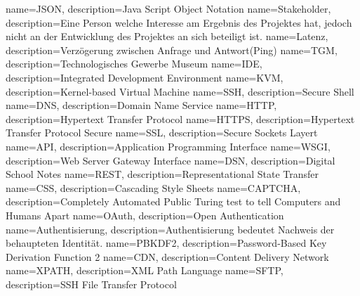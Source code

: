 \makeglossaries
{} {name=JSON, description={Java Script Object Notation}}
 {name=Stakeholder, description={Eine Person welche Interesse am Ergebnis des Projektes hat, jedoch nicht an der Entwicklung des Projektes an sich beteiligt ist.}}
 {name=Latenz, description={Verzögerung zwischen Anfrage und Antwort(Ping)}}
 {name=TGM, description={Technologisches Gewerbe Museum}}
 {name=IDE, description={Integrated Development Environment}}
 {name=KVM, description={Kernel-based Virtual Machine}}
 {name=SSH, description={Secure Shell}}
 {name=DNS, description={Domain Name Service}}
 {name=HTTP, description={Hypertext Transfer Protocol}}
 {name=HTTPS, description={Hypertext Transfer Protocol Secure}}
 {name=SSL, description={Secure Sockets Layert}}
 {name=API, description={Application Programming Interface}}
 {name=WSGI, description={Web Server Gateway Interface}}
 {name=DSN, description={Digital School Notes}}
 {name=REST, description={Representational State Transfer}}
 {name=CSS, description={Cascading Style Sheets}}
 {name=CAPTCHA, description={Completely Automated Public Turing test to tell Computers and Humans Apart}}
 {name=OAuth, description={Open Authentication}}
 {name=Authentisierung, description={Authentisierung bedeutet Nachweis der behaupteten Identität.}}
 {name=PBKDF2, description={Password-Based Key Derivation Function 2}}
 {name=CDN, description={Content Delivery Network}}
 {name=XPATH, description={XML Path Language}}
 {name=SFTP, description={SSH File Transfer Protocol}}

\renewcommand*\glspostdescription{\dotfill}

